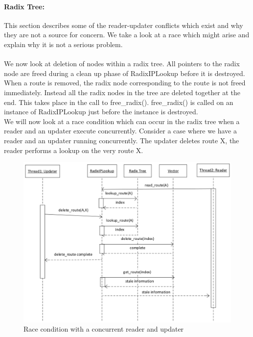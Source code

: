\documentclass{article}
\begin{document}
\paragraph{Radix Tree:}
This section describes some of the reader-updater conflicts which exist and why they are not a source for concern. We take a look at a race which might arise and explain why it is not a serious problem.
\\
\\We now look at deletion of nodes within a radix tree. All pointers to the radix node are freed during a clean up phase of RadixIPLookup before it is destroyed. When a route is removed, the radix node corresponding to the route is not freed immediately. Instead all the radix nodes in the tree are deleted together at the end. This takes place in the call to free\_radix(). free\_radix() is called on an instance of RadixIPLookup just before the instance is destroyed.
\\
We will now look at a race condition which can occur in the radix tree when a reader and an updater execute concurrently. Consider a case where we have a reader and an updater running concurrently. The updater deletes route X, the reader performs a lookup on the very route X.
\begin{figure}[tph]
\begin{center}
\includegraphics[scale=0.6]{../images/diagrams/race1eps.eps}
\end{center}
\caption{Race condition with a concurrent reader and updater}
\label{race1figure}
\end{figure}
\\\\
\end{document}
